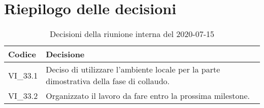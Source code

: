 \section{Riepilogo delle decisioni}
\begin{longtable}{ 
	 >{\centering}p{} >{}p{} }
	
	\caption{Decisioni della riunione interna del 2020-07-15}\\	
	
	\textbf{\color{white}Codice} & 
	\textbf{\color{white}Decisione} 
	\tabularnewline  
	\endhead
	
	VI\_33.1 & Deciso di utilizzare l'ambiente locale per la parte dimostrativa della fase di collaudo. \\
	VI\_33.2 & Organizzato il lavoro da fare entro la prossima milestone\textit{\ped{G}}. \\
\end{longtable}
